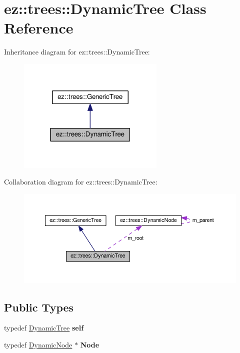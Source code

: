 \hypertarget{classez_1_1trees_1_1DynamicTree}{}\section{ez\+:\+:trees\+:\+:Dynamic\+Tree Class Reference}
\label{classez_1_1trees_1_1DynamicTree}


Inheritance diagram for ez\+:\+:trees\+:\+:Dynamic\+Tree\+:
\nopagebreak
\begin{figure}[H]
\begin{center}
\leavevmode
\includegraphics[width=199pt]{classez_1_1trees_1_1DynamicTree__inherit__graph}
\end{center}
\end{figure}


Collaboration diagram for ez\+:\+:trees\+:\+:Dynamic\+Tree\+:
\nopagebreak
\begin{figure}[H]
\begin{center}
\leavevmode
\includegraphics[width=350pt]{classez_1_1trees_1_1DynamicTree__coll__graph}
\end{center}
\end{figure}
\subsection*{Public Types}
\begin{DoxyCompactItemize}
\item 
\mbox{\label{classez_1_1trees_1_1DynamicTree_a6c838c0e4a52ab62eafabcd98cd123dc}} 
typedef \hyperlink{classez_1_1trees_1_1DynamicTree}{Dynamic\+Tree} {\bfseries self}
\item 
\mbox{\label{classez_1_1trees_1_1DynamicTree_afb62febcd0e0b8ab3715fc706d24add7}} 
typedef \hyperlink{classez_1_1trees_1_1DynamicNode}{Dynamic\+Node} $\ast$ {\bfseries Node}
\end{DoxyCompactItemize}
